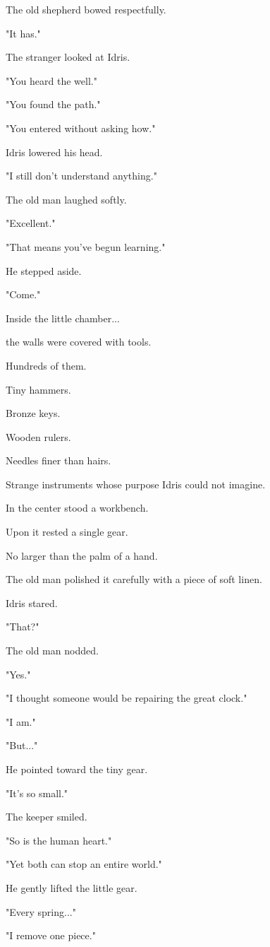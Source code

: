 \documentclass[12pt,openany]{book}
\begin{document}
The old shepherd bowed respectfully.

"It has."

The stranger looked at Idris.

"You heard the well."

"You found the path."

"You entered without asking how."

Idris lowered his head.

"I still don't understand anything."

The old man laughed softly.

"Excellent."

"That means you've begun learning."

He stepped aside.

"Come."

Inside the little chamber...

the walls were covered with tools.

Hundreds of them.

Tiny hammers.

Bronze keys.

Wooden rulers.

Needles finer than hairs.

Strange instruments whose purpose Idris could not imagine.

In the center stood a workbench.

Upon it rested a single gear.

No larger than the palm of a hand.

The old man polished it carefully with a piece of soft linen.

Idris stared.

"That?"

The old man nodded.

"Yes."

"I thought someone would be repairing the great clock."

"I am."

"But..."

He pointed toward the tiny gear.

"It's so small."

The keeper smiled.

"So is the human heart."

"Yet both can stop an entire world."

He gently lifted the little gear.

"Every spring..."

"I remove one piece."
\end{document}
